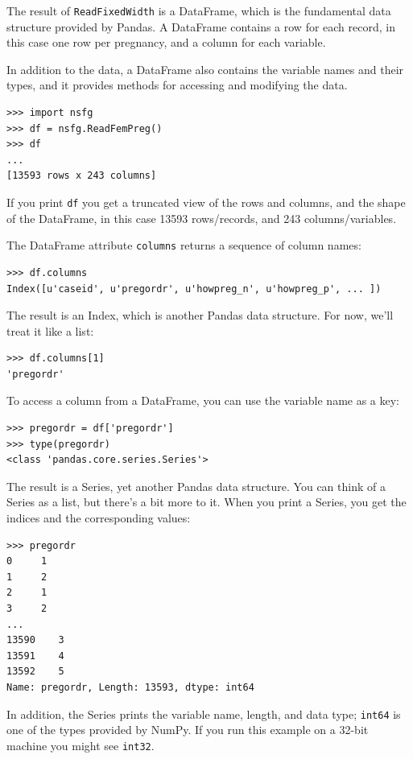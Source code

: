 \documentclass[12pt]{book}
\begin{document}
The result of {\tt ReadFixedWidth} is a DataFrame, which is the
fundamental data structure provided by Pandas.  A DataFrame contains a
row for each record, in this case one row per pregnancy, and a column
for each variable.

In addition to the data, a DataFrame also contains the variable
names and their types, and it provides methods for accessing and modifying
the data.

\begin{verbatim}
>>> import nsfg
>>> df = nsfg.ReadFemPreg()
>>> df
...
[13593 rows x 243 columns]
\end{verbatim}

If you print {\tt df} you get a truncated view of the rows and
columns, and the shape of the DataFrame, in this case 13593
rows/records, and 243 columns/variables.

The DataFrame attribute {\tt columns} returns a sequence of column
names:

\begin{verbatim}
>>> df.columns
Index([u'caseid', u'pregordr', u'howpreg_n', u'howpreg_p', ... ])
\end{verbatim}

The result is an Index, which is another Pandas data structure.  For
now, we'll treat it like a list:

\begin{verbatim}
>>> df.columns[1]
'pregordr'
\end{verbatim}

To access a column from a DataFrame, you can use the variable
name as a key:

\begin{verbatim}
>>> pregordr = df['pregordr']
>>> type(pregordr)
<class 'pandas.core.series.Series'>
\end{verbatim}

The result is a Series, yet another Pandas data structure.
You can think of a Series as a list, but there's
a bit more to it.  When you print a Series, you get the indices and the
corresponding values:

\begin{verbatim}
>>> pregordr
0     1
1     2
2     1
3     2
...
13590    3
13591    4
13592    5
Name: pregordr, Length: 13593, dtype: int64
\end{verbatim}

In addition, the Series prints the variable name, length, and data type;
{\tt int64} is one of the types provided by NumPy.  If you run
this example on a 32-bit machine you might see {\tt int32}.
\end{document}
